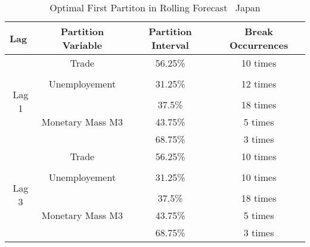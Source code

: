 \begin{table}[t] %
  \centering
    \caption[Japan: GTS-OLS Optimal First Partition Split]{Optimal First Partiton in Rolling Forecast \textendash \ Japan}
  \begin{tabular}{lccc} %
    \cmidrule(r){1-4}
    Lag                                             & Partition Variable                &  Partition Interval       & Break Occurrences \\
    \midrule
    \multicolumn{1}{c|}{\multirow{7}{*}{Lag 1}}      & Trade                             & 56.25\%                   & 10 times \\
    \multicolumn{1}{c|}{}                           &                                   &                           &          \\    
    \multicolumn{1}{c|}{}                           & Unemployement                     & 31.25\%                   & 12 times \\
    \multicolumn{1}{c|}{}                           &                                   &                           &          \\    
    \multicolumn{1}{c|}{}                           & \multirow{3}{*}{Monetary Mass M3} & 37.5\%                    & 18 times \\
    \multicolumn{1}{c|}{}                           &                                   & 43.75\%                   & 5 times  \\
    \multicolumn{1}{c|}{}                           &                                   & 68.75\%                   & 3 times  \\ \cline{1-4}

    \multicolumn{1}{c|}{\multirow{7}{*}{Lag 3}}      & Trade                             & 56.25\%                   & 10 times \\
    \multicolumn{1}{c|}{}                           &                                   &                           &          \\    
    \multicolumn{1}{c|}{}                           & Unemployement                     & 31.25\%                   & 10 times \\
    \multicolumn{1}{c|}{}                           &                                   &                           &          \\    
    \multicolumn{1}{c|}{}                           & \multirow{3}{*}{Monetary Mass M3} & 37.5\%                    & 18 times \\
    \multicolumn{1}{c|}{}                           &                                   & 43.75\%                   & 5 times  \\
    \multicolumn{1}{c|}{}                           &                                   & 68.75\%                   & 3 times  \\ \cline{1-4}    


\end{tabular}
\end{table}
